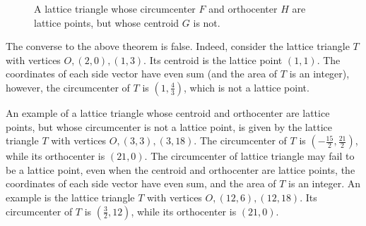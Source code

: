 \documentclass[10pt,preprint]{amsart}
\theoremstyle{plain}
\theoremstyle{definition}
\theoremstyle{remark}
\begin{document}
\begin{figure}
\begin{center}
\caption{A lattice triangle whose circumcenter $F$ and orthocenter $H$ are lattice points, but whose centroid $G$ is not.}\label{F:badcent}
\end{center}
\end{figure}


The converse to the above theorem is false. Indeed, consider the lattice triangle $T$ with vertices $O,(2,0),(1,3)$. Its centroid is the lattice point $(1,1)$. The coordinates of each side vector have even sum (and the area of $T$ is an integer),
however, the circumcenter of $T$ is $(1,\frac43)$, which is not a lattice point. 

An example of a lattice triangle whose centroid and orthocenter are lattice points, but whose circumcenter is not a lattice point,
is given by the lattice triangle $T$ with vertices $O,(3,3),(3,18)$. The circumcenter of $T$ is $(-\frac{15}2,\frac{21}2)$, while its orthocenter is $(21,0)$.
The circumcenter of  lattice triangle may fail to be a lattice point, even when the centroid and orthocenter are lattice points, the coordinates of each side vector have even sum, and the area of $T$ is an integer. An example is the lattice triangle $T$ with vertices $O,(12,6),(12,18)$. 
Its circumcenter of $T$ is $(\frac32,12)$, while its orthocenter is $(21,0)$.
\end{document}
